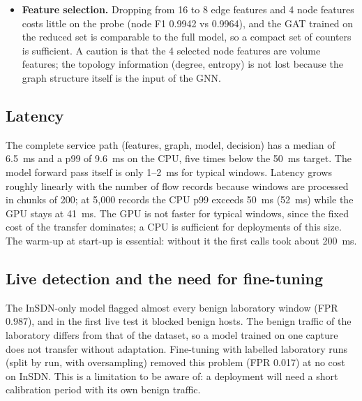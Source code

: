 \begin{itemize}
	\item \textbf{Feature selection.} Dropping from 16 to 8 edge features and 4 node features costs little on the probe (node F1 0.9942 vs 0.9964), and the GAT trained on the reduced set is comparable to the full model, so a compact set of counters is sufficient. A caution is that the 4 selected node features are volume features; the topology information (degree, entropy) is not lost because the graph structure itself is the input of the GNN.
\end{itemize}

\subsection{Latency}
The complete service path (features, graph, model, decision) has a median of 6.5~ms and a p99 of 9.6~ms on the CPU, five times below the 50~ms target. The model forward pass itself is only 1--2~ms for typical windows. Latency grows roughly linearly with the number of flow records because windows are processed in chunks of 200; at 5,000 records the CPU p99 exceeds 50~ms (52~ms) while the GPU stays at 41~ms. The GPU is not faster for typical windows, since the fixed cost of the transfer dominates; a CPU is sufficient for deployments of this size. The warm-up at start-up is essential: without it the first calls took about 200~ms.

\subsection{Live detection and the need for fine-tuning}
The InSDN-only model flagged almost every benign laboratory window (FPR 0.987), and in the first live test it blocked benign hosts. The benign traffic of the laboratory differs from that of the dataset, so a model trained on one capture does not transfer without adaptation. Fine-tuning with labelled laboratory runs (split by run, with oversampling) removed this problem (FPR 0.017) at no cost on InSDN. This is a limitation to be aware of: a deployment will need a short calibration period with its own benign traffic.

